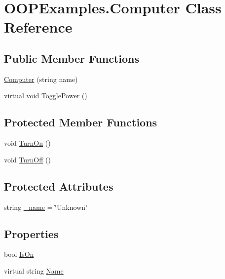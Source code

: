 \hypertarget{class_o_o_p_examples_1_1_computer}{}\section{O\+O\+P\+Examples.\+Computer Class Reference}
\label{class_o_o_p_examples_1_1_computer}
\subsection*{Public Member Functions}
\begin{DoxyCompactItemize}
\item 
\mbox{\hyperlink{class_o_o_p_examples_1_1_computer_ae42250a9cb267a84a1e9c4cb12fca1ac}{Computer}} (string name)
\item 
virtual void \mbox{\hyperlink{class_o_o_p_examples_1_1_computer_ad5fef11d2efb39d91e2e23eeda6c7f68}{Toggle\+Power}} ()
\end{DoxyCompactItemize}
\subsection*{Protected Member Functions}
\begin{DoxyCompactItemize}
\item 
void \mbox{\hyperlink{class_o_o_p_examples_1_1_computer_a9b61ecf3ab167628d80a973abb6d4166}{Turn\+On}} ()
\item 
void \mbox{\hyperlink{class_o_o_p_examples_1_1_computer_acb10f1d4d7156f99c4ed312b49a95a16}{Turn\+Off}} ()
\end{DoxyCompactItemize}
\subsection*{Protected Attributes}
\begin{DoxyCompactItemize}
\item 
string \mbox{\hyperlink{class_o_o_p_examples_1_1_computer_a96460431d655bd0103de79e25011a098}{\+\_\+name}} = \char`\"{}Unknown\char`\"{}
\end{DoxyCompactItemize}
\subsection*{Properties}
\begin{DoxyCompactItemize}
\item 
bool \mbox{\hyperlink{class_o_o_p_examples_1_1_computer_a304cb089cc592030d2d2cd4a856ddb5f}{Is\+On}}
\item 
virtual string \mbox{\hyperlink{class_o_o_p_examples_1_1_computer_af43574d61dd28bd460eeeec609f03ae6}{Name}}
\end{DoxyCompactItemize}


